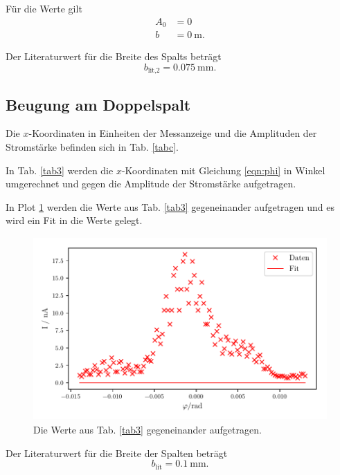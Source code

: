\noindent Für die Werte gilt
\begin{align*}
    A_0 &= \num{0} \\
    b &= \SI{0}{\meter}.
\end{align*}

\noindent Der Literaturwert für die Breite des Spalts beträgt
\begin{equation*}
    b_{\text{lit,2}} = \SI{0.075}{\milli\meter}.
\end{equation*}


\subsection{Beugung am Doppelspalt}
Die $x$-Koordinaten in Einheiten der Messanzeige und die Amplituden der Stromstärke befinden sich in Tab. \ref{tabc}. 



\noindent In Tab. \ref{tab3} werden die $x$-Koordinaten mit Gleichung \eqref{eqn:phi} in Winkel umgerechnet und gegen die Amplitude der Stromstärke aufgetragen. 



\noindent In Plot \ref{fig:plot3} werden die Werte aus Tab. \ref{tab3} gegeneinander aufgetragen und es wird ein Fit in die Werte gelegt. 

\begin{figure}
    \centering
    \includegraphics[width=12cm, height=7cm]{build/plot3.pdf}
    \caption{Die Werte aus Tab. \ref{tab3} gegeneinander aufgetragen.}
    \label{fig:plot3}
\end{figure}

\noindent Der Literaturwert für die Breite der Spalten beträgt
\begin{equation*}
    b_{\text{lit}} = \SI{0.1}{\milli\meter}.
\end{equation*}